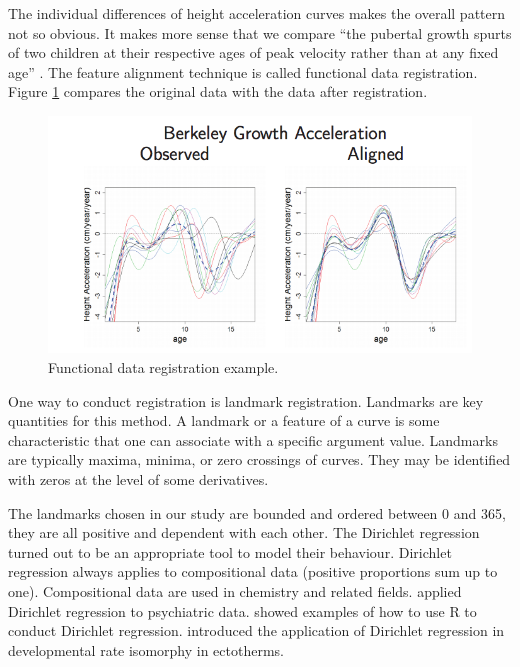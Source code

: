 \documentclass{article}\usepackage[]{graphicx}\usepackage[]{color}
\begin{document}
The individual differences of height acceleration curves makes the overall pattern not so obvious. It makes more sense that we compare ``the pubertal growth spurts of two children at their respective ages of peak velocity rather than at any fixed age'' \citep{ramsay2006functional}. The feature alignment technique is called functional data registration. Figure \ref{Fig:fdaregi} compares the original data with the data after registration.

\begin{figure}[!ht]
\centering
\includegraphics[width=14cm]{egregistration.png}
\caption{Functional data registration example. \citep{FDAGiles}}
\label{Fig:fdaregi}
\end{figure}

One way to conduct registration is landmark registration. Landmarks are key quantities for this method. 
A landmark or a feature of a curve is some characteristic that one can associate with a specific argument value. Landmarks are typically maxima, minima, or zero crossings of curves.
They may be identified with zeros at the level of some derivatives.

The landmarks chosen in our study are bounded and ordered between 0 and 365, they are all positive and dependent with each other. The Dirichlet regression \citep{hijazi2009modelling} turned out to be an appropriate tool to model their behaviour. Dirichlet regression always applies to compositional data (positive proportions sum up to one). Compositional data are used in chemistry  and related fields.  \citet{gueorguieva2008dirichlet} applied Dirichlet regression to psychiatric data.  \citet{maier2014dirichletreg} showed examples of how to use R to conduct Dirichlet regression. \citet{boukal2015analyses} introduced the application of Dirichlet regression in developmental rate isomorphy in ectotherms. 
\end{document}
